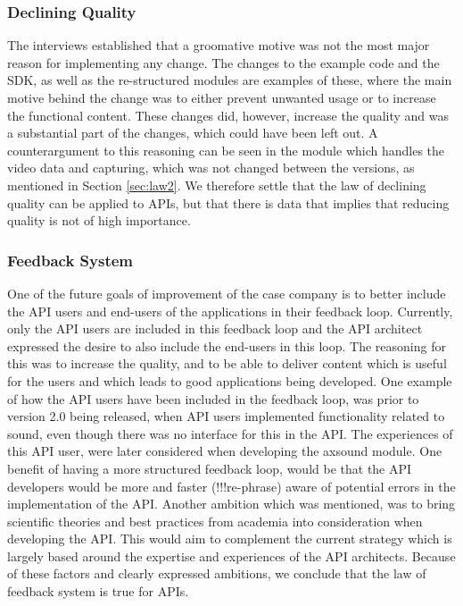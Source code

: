 \documentclass{sig-alternate}
\begin{document}
\subsubsection{Declining Quality}
The interviews established that a groomative motive was not the most major reason for implementing any change. The changes to the example code and the SDK, as well as the re-structured modules are examples of these, where the main motive behind the change was to either prevent unwanted usage or to increase the functional content. These changes did, however, increase the quality and was a substantial part of the changes, which could have been left out. A counterargument to this reasoning can be seen in the module which handles the video data and capturing, which was not changed between the versions, as mentioned in Section \ref{sec:law2}. We therefore settle that the law of declining quality can be applied to APIs, but that there is data that implies that reducing quality is not of high importance. 

\subsubsection{Feedback System}
One of the future goals of improvement of the case company is to better include the API users and end-users of the applications in their feedback loop. Currently, only the API users are included in this feedback loop and the API architect expressed the desire to also include the end-users in this loop. The reasoning for this was to increase the quality, and to be able to deliver content which is useful for the users and which leads to good applications being developed. One example of how the API users have been included in the feedback loop, was prior to version 2.0 being released, when API users implemented functionality related to sound, even though there was no interface for this in the API. The experiences of this API user, were later considered when developing the axsound module. One benefit of having a more structured feedback loop, would be that the API developers would be more and faster (!!!re-phrase) aware of potential errors in the implementation of the API. Another ambition which was mentioned, was to bring scientific theories and best practices from academia into consideration when developing the API. This would aim to complement the current strategy which is largely based around the expertise and experiences of the API architects. Because of these factors and clearly expressed ambitions, we conclude that the law of feedback system is true for APIs. 
\end{document}
